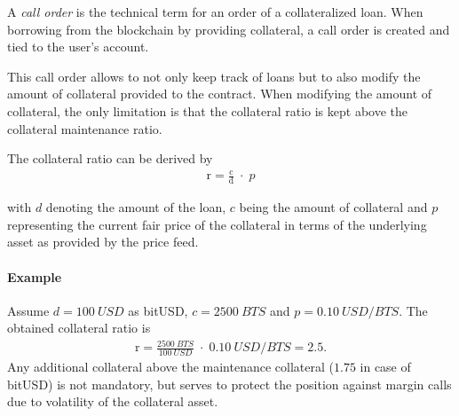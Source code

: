 \label{sec:callorder}

A \emph{call order} is the technical term for an order of a collateralized
loan. When borrowing from the blockchain by providing collateral, a call order
is created and tied to the user's account.

This call order allows to not only keep track of loans but to also modify the
amount of collateral provided to the contract. When modifying the amount of
collateral, the only limitation is that the collateral ratio is kept above the
collateral maintenance ratio.

The collateral ratio can be derived by
\begin{align*}
 \text{r} = \frac{\text{c}}{\text{d}} \;\cdot\; p
\end{align*}

with $d$ denoting the amount of the loan, $c$ being the
amount of collateral and $p$ representing the current
fair price of the collateral in terms of the underlying asset as provided by
the price feed.

\paragraph{Example}
Assume $d = \SI{100}{USD}$ as bitUSD, $c = \SI{2500}{BTS}$ and $p = \SI{0.10}{USD \per BTS}$.
The obtained collateral ratio is
\begin{align*}
 \text{r} = \frac{\SI{2500}{BTS}}{\SI{100}{USD}} \;\cdot\; \SI{0.10}{USD \per BTS} = 2.5.
\end{align*}
Any additional collateral above the maintenance collateral ($1.75$ in case of
bitUSD) is not mandatory, but serves to protect the position against margin calls due to
volatility of the collateral asset.



